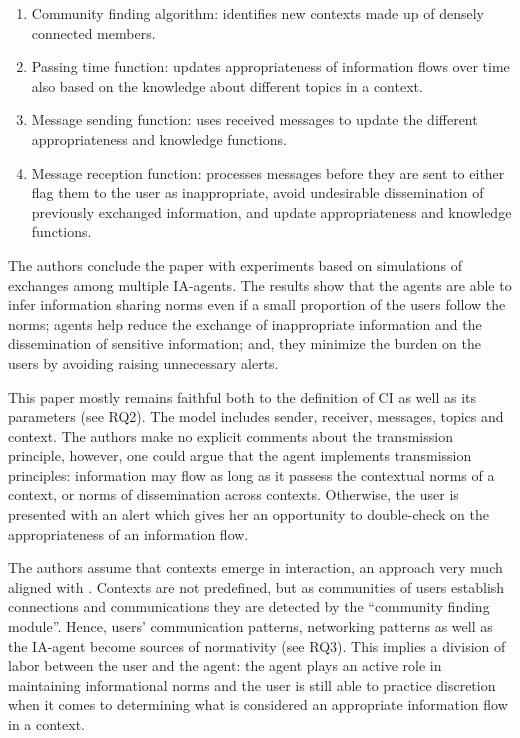\documentclass[../thesis.tex]{subfiles}
\newcommand\liststyleWWNumiii{%
\renewcommand\theenumi{\arabic{enumi}}
\renewcommand\theenumii{\alph{enumii}}
\renewcommand\theenumiii{\roman{enumiii}}
\renewcommand\theenumiv{\arabic{enumiv}}
\renewcommand\labelenumi{\theenumi.}
\renewcommand\labelenumii{\theenumii.}
\renewcommand\labelenumiii{\theenumiii.}
\renewcommand\labelenumiv{\theenumiv.}
}
\begin{document}
\liststyleWWNumiii
\begin{enumerate}
\item Community finding algorithm: identifies new contexts made up of
densely connected members.
\item Passing time function: updates appropriateness of information
flows over time also based on the knowledge about different topics in a
context.
\item Message sending function: uses received messages to update the
different appropriateness and knowledge functions.
\item Message reception function: processes messages before they are
sent to either flag them to the user as inappropriate, avoid
undesirable dissemination of previously exchanged information, and
update appropriateness and knowledge functions.
\end{enumerate}
The authors conclude the paper with experiments based on simulations of
exchanges among multiple IA-agents. The results show that the agents
are able to infer information sharing norms even if a small proportion
of the users follow the norms; agents help reduce the exchange of
inappropriate information and the dissemination of sensitive
information; and, they minimize the burden on the users by avoiding
raising unnecessary alerts.

This paper mostly remains faithful both to the definition of CI as well
as its parameters (see RQ2). The model includes sender, receiver,
messages, topics and context. The authors make no explicit comments
about the transmission principle, however, one could argue that the
agent implements transmission principles: information may flow as long
as it passess the contextual norms of a context, or norms of
dissemination across contexts. Otherwise, the user is presented with an
alert which gives her an opportunity to double-check on the
appropriateness of an information flow.

The authors assume that contexts emerge in interaction, an approach very
much aligned with \citet{dourish2004we}. Contexts are not predefined, but as
communities of users establish connections and communications they are
detected by the ``community finding
module''. Hence, users' communication
patterns, networking patterns as well as the IA-agent become sources of
normativity (see RQ3). This implies a division of labor between the user
and the agent: the agent plays an active role in maintaining
informational norms and the user is still able to practice discretion
when it comes to determining what is considered an appropriate
information flow in a context.
\end{document}
